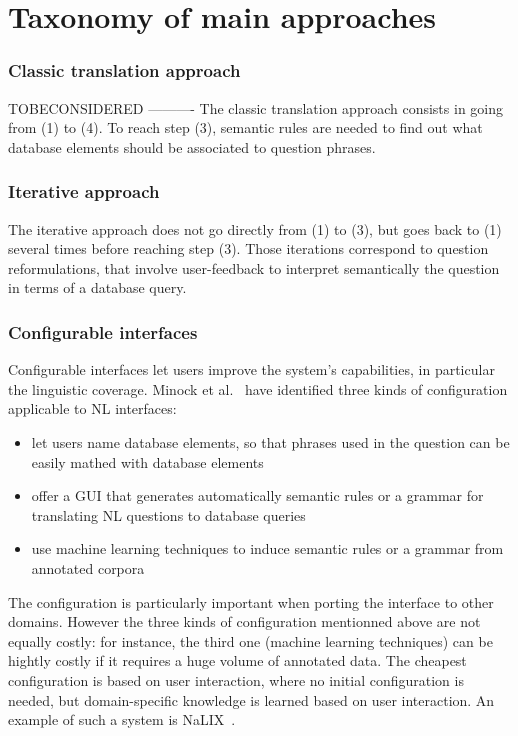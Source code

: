 \documentclass[10pt,journal,letterpaper,compsoc]{IEEEtran}
\begin{document}
\section{Taxonomy of main approaches}
\label{sec:overview}





\subsubsection{Classic translation approach}
TOBECONSIDERED
----------
The classic translation approach consists in going from (1) to (4).
To reach step (3), semantic rules are needed to find out what database elements
should be associated to question phrases. 

\subsubsection{Iterative approach}
The iterative approach does not go directly from (1) to (3), but goes back to
(1) several times before reaching step (3). 
Those iterations correspond to question reformulations, that involve
user-feedback to interpret semantically the question in terms of a database
query.

\subsubsection{Configurable interfaces}
Configurable interfaces let users improve the system's capabilities, in
particular the linguistic coverage. 
Minock et al.~\cite{Minock:2010:CSB:1715942.1716190} have identified three kinds
of configuration applicable to NL interfaces:
\begin{itemize}
  \item let users name database elements, so that phrases used in the question
  can be easily mathed with database elements
  \item offer a GUI that generates automatically semantic rules or a grammar for
  translating NL questions to database queries
  \item use machine learning techniques to induce semantic rules or a grammar
  from annotated corpora
\end{itemize}
The configuration is particularly important when porting the interface to other
domains. However the three kinds of configuration mentionned above are not
equally costly: for instance, the third one (machine learning techniques) can be
hightly costly if it requires a huge volume of annotated data. The cheapest
configuration is based on user interaction, where no initial configuration is
needed, but domain-specific knowledge is learned based on user interaction. An
example of such a system is {\sc NaLIX}~\cite{Li:2005:NIN:1066157.1066281}.
\end{document}
